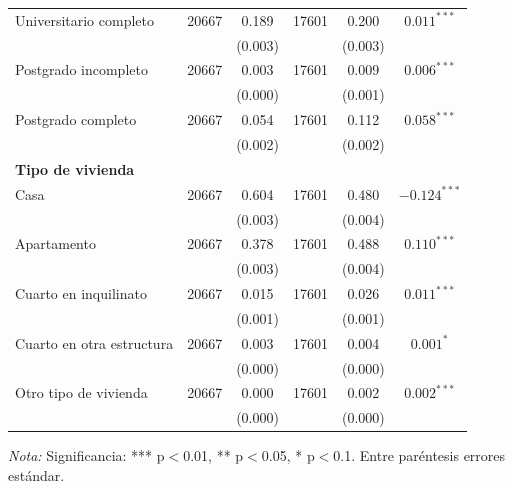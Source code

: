 \documentclass{article}
\begin{document}
\begin{table}[H]
\begin{tabular}{l c c c c c}
    Universitario completo & 20667 & 0.189 & 17601 & 0.200 & $0.011^{***}$ \\
     & & (0.003) & & (0.003) & \\
    Postgrado incompleto & 20667 & 0.003 & 17601 & 0.009 & $0.006^{***}$ \\
     & & (0.000) & & (0.001) & \\
    Postgrado completo & 20667 & 0.054 & 17601 & 0.112 & $0.058^{***}$ \\
     & & (0.002) & & (0.002) & \\
    \midrule
    \textbf{Tipo de vivienda} & & & & & \\
    Casa & 20667 & 0.604 & 17601 & 0.480 & $-0.124^{***}$ \\
     & & (0.003) & & (0.004) & \\
    Apartamento & 20667 & 0.378 & 17601 & 0.488 & $0.110^{***}$ \\
     & & (0.003) & & (0.004) & \\
    Cuarto en inquilinato & 20667 & 0.015 & 17601 & 0.026 & $0.011^{***}$ \\
     & & (0.001) & & (0.001) & \\
    Cuarto en otra estructura & 20667 & 0.003 & 17601 & 0.004 & $0.001^{*}$ \\
     & & (0.000) & & (0.000) & \\
    Otro tipo de vivienda & 20667 & 0.000 & 17601 & 0.002 & $0.002^{***}$ \\
     & & (0.000) & & (0.000) & \\
    \bottomrule
  \end{tabular}
  \parbox[t]{\textwidth}{%
    \vspace{0.5em}
    \footnotesize{\textit{Nota:} Significancia: *** p$<$0.01, ** p$<$0.05, * p$<$0.1. Entre paréntesis errores estándar.}}
\end{table}
\end{document}
